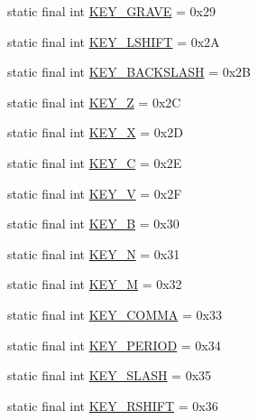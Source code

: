\begin{DoxyCompactItemize}
static final int \mbox{\hyperlink{classorg_1_1newdawn_1_1slick_1_1_input_acd7ccda5518ab782a66e9c36caaf17ed}{K\+E\+Y\+\_\+\+G\+R\+A\+VE}} = 0x29
\item 
static final int \mbox{\hyperlink{classorg_1_1newdawn_1_1slick_1_1_input_ade55e4e65b55b0f239f773329ad498ef}{K\+E\+Y\+\_\+\+L\+S\+H\+I\+FT}} = 0x2A
\item 
static final int \mbox{\hyperlink{classorg_1_1newdawn_1_1slick_1_1_input_ab5413c95ee24f0bc94114af542508f8e}{K\+E\+Y\+\_\+\+B\+A\+C\+K\+S\+L\+A\+SH}} = 0x2B
\item 
static final int \mbox{\hyperlink{classorg_1_1newdawn_1_1slick_1_1_input_abb36cdc8dc9d4d67915c7d610cf66cb9}{K\+E\+Y\+\_\+Z}} = 0x2C
\item 
static final int \mbox{\hyperlink{classorg_1_1newdawn_1_1slick_1_1_input_a63a7144dce8f6d77beec2a4d10066950}{K\+E\+Y\+\_\+X}} = 0x2D
\item 
static final int \mbox{\hyperlink{classorg_1_1newdawn_1_1slick_1_1_input_a7738977bece6352509fc729f67054153}{K\+E\+Y\+\_\+C}} = 0x2E
\item 
static final int \mbox{\hyperlink{classorg_1_1newdawn_1_1slick_1_1_input_a1e3d4a1b35ca92fcf418b2446fbc01f9}{K\+E\+Y\+\_\+V}} = 0x2F
\item 
static final int \mbox{\hyperlink{classorg_1_1newdawn_1_1slick_1_1_input_ac09052337445966ecd82cb6e4f134985}{K\+E\+Y\+\_\+B}} = 0x30
\item 
static final int \mbox{\hyperlink{classorg_1_1newdawn_1_1slick_1_1_input_aea54629b73ea7cb77bd56d72526b92a1}{K\+E\+Y\+\_\+N}} = 0x31
\item 
static final int \mbox{\hyperlink{classorg_1_1newdawn_1_1slick_1_1_input_a6b6f17296a131e3a79e935694fa4f9ef}{K\+E\+Y\+\_\+M}} = 0x32
\item 
static final int \mbox{\hyperlink{classorg_1_1newdawn_1_1slick_1_1_input_a4e344f10dac56c1028056995282c109b}{K\+E\+Y\+\_\+\+C\+O\+M\+MA}} = 0x33
\item 
static final int \mbox{\hyperlink{classorg_1_1newdawn_1_1slick_1_1_input_a2af208b732d7186d7afcb3eeb8015fb9}{K\+E\+Y\+\_\+\+P\+E\+R\+I\+OD}} = 0x34
\item 
static final int \mbox{\hyperlink{classorg_1_1newdawn_1_1slick_1_1_input_a4d9ce7cdf81e846e8a771ca73d22899d}{K\+E\+Y\+\_\+\+S\+L\+A\+SH}} = 0x35
\item 
static final int \mbox{\hyperlink{classorg_1_1newdawn_1_1slick_1_1_input_a6c79f61e512749279c94e4766cdb66d2}{K\+E\+Y\+\_\+\+R\+S\+H\+I\+FT}} = 0x36
\item 

\end{DoxyCompactItemize}
